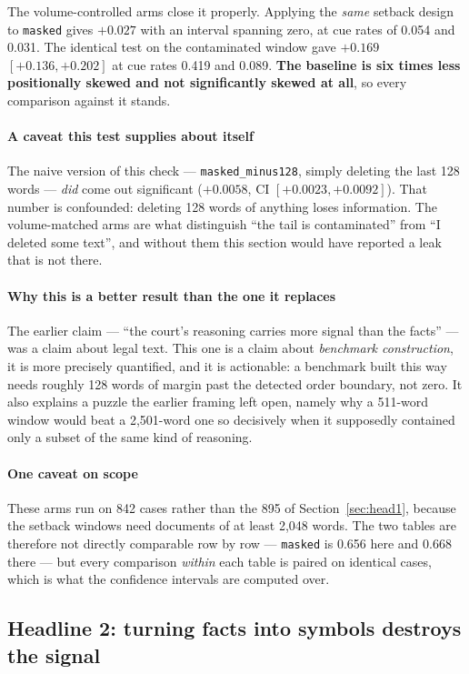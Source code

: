 \documentclass[12pt,a4paper]{article}
\newcommand{\code}[1]{\texttt{\small #1}}
\begin{document}
The volume-controlled arms close it properly. Applying the \emph{same} setback design to
\code{masked} gives $+0.027$ with an interval spanning zero, at cue rates of 0.054 and 0.031. The
identical test on the contaminated window gave $+0.169$ $[+0.136, +0.202]$ at cue rates 0.419 and
0.089. \textbf{The baseline is six times less positionally skewed and not significantly skewed at
all}, so every comparison against it stands.

\paragraph{A caveat this test supplies about itself} The naive version of this check ---
\code{masked\_minus128}, simply deleting the last 128 words --- \emph{did} come out significant
($+0.0058$, CI $[+0.0023, +0.0092]$). That number is confounded: deleting 128 words of anything
loses information. The volume-matched arms are what distinguish ``the tail is contaminated'' from
``I deleted some text'', and without them this section would have reported a leak that is not
there.

\paragraph{Why this is a better result than the one it replaces} The earlier claim --- ``the court's
reasoning carries more signal than the facts'' --- was a claim about legal text. This one is a claim
about \emph{benchmark construction}, it is more precisely quantified, and it is actionable: a
benchmark built this way needs roughly 128 words of margin past the detected order boundary, not
zero. It also explains a puzzle the earlier framing left open, namely why a 511-word window would
beat a 2,501-word one so decisively when it supposedly contained only a subset of the same kind of
reasoning.

\paragraph{One caveat on scope} These arms run on 842 cases rather than the 895 of
Section~\ref{sec:head1}, because the setback windows need documents of at least 2,048 words. The two
tables are therefore not directly comparable row by row --- \code{masked} is 0.656 here and 0.668
there --- but every comparison \emph{within} each table is paired on identical cases, which is what
the confidence intervals are computed over.

\subsection{Headline 2: turning facts into symbols destroys the signal}\label{sec:head2}
\end{document}
